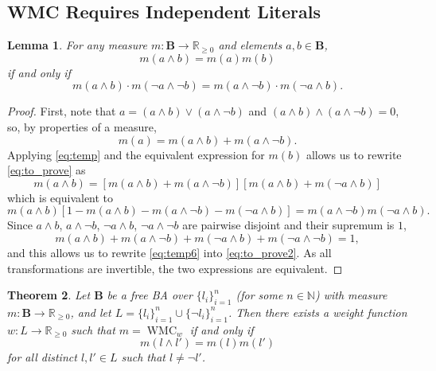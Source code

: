 \documentclass{article}
\newtheorem{theorem}{Theorem}
\newtheorem{lemma}[theorem]{Lemma}
\theoremstyle{definition}
\theoremstyle{remark}
\DeclareMathOperator{\WMC}{WMC}
\begin{document}
\subsection{WMC Requires Independent Literals}

\begin{lemma} \label{lemma:before_theorem}
  For any measure $m\colon \mathbf{B} \to \mathbb{R}_{\ge 0}$ and elements $a, b
  \in \mathbf{B}$,
  \begin{equation} \label{eq:to_prove}
    m(a \land b) = m(a)m(b)
  \end{equation}
  if and only if
  \begin{equation} \label{eq:to_prove2}
    m(a \land b) \cdot m(\neg a \land \neg b) = m(a \land \neg b)
    \cdot m(\neg a \land b).
  \end{equation}
\end{lemma}
\begin{proof}
  First, note that $a = (a \land b) \lor (a \land \neg b)$ and $(a \land b)
  \land (a \land \neg b) = 0$, so, by properties of a measure,
  \begin{equation} \label{eq:temp}
    m(a) = m(a \land b) + m(a \land \neg b).
  \end{equation}
  Applying \cref{eq:temp} and the equivalent expression for $m(b)$ allows us
  to rewrite \cref{eq:to_prove} as
  \[
    m(a \land b) = [m(a \land b) + m(a \land \neg b)][m(a \land b) + m(\neg a
    \land b)]
  \]
  which is equivalent to
  \begin{equation} \label{eq:temp6}
    m(a \land b)[1 - m(a \land b) - m(a \land \neg b) - m(\neg a \land b)] = m(a
    \land \neg b)m(\neg a \land b).
  \end{equation}
  Since $a \land b$, $a \land \neg b$, $\neg a \land b$, $\neg a \land \neg b$
  are pairwise disjoint and their supremum is $1$,
  \[
    m(a \land b) + m(a \land \neg b) + m(\neg a \land b) + m(\neg a \land \neg
    b) = 1,
  \]
  and this allows us to rewrite \cref{eq:temp6} into \cref{eq:to_prove2}. As all
  transformations are invertible, the two expressions are equivalent.
\end{proof}

\begin{theorem}
  Let $\mathbf{B}$ be a free BA over $\{ l_i \}_{i=1}^n$ (for some $n \in
  \mathbb{N}$) with measure $m\colon \mathbf{B} \to \mathbb{R}_{\ge 0}$, and let
  $L = \{ l_i \}_{i = 1}^n \cup \{ \neg l_i \}_{i = 1}^n$. Then there exists a
  weight function $w\colon L \to \mathbb{R}_{\ge 0}$ such that $m = \WMC_w$ if
  and only if
  \begin{equation} \label{eq:wmccondition}
  m(l \land l') = m(l)m(l')
  \end{equation}
  for all distinct $l, l' \in L$ such that $l \ne \neg l'$.
\end{theorem}
\end{document}
